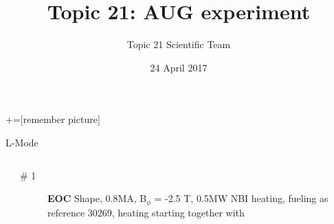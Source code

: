 \documentclass[10pt, compress]{beamer}
\title{Topic 21: AUG experiment}
\date{24 April 2017}
\author[Topic 21 Scientific Team]{Topic 21 Scientific Team}
\newcommand\Fontvi{\fontsize{8}{7.2}\selectfont}
\begin{document}
+=[remember picture]
\maketitle

\begin{frame}{L-Mode}
\Fontvi
  \vspace{-1cm}
\begin{columns}
  \begin{column}{0.5\textwidth}
  \end{column}
  \begin{column}{0.5\textwidth}
    \begin{description}
      \item[\# 1] \textbf{EOC} Shape, 0.8MA, B$_{\phi}$ = -2.5 T, 0.5MW NBI heating,
        fueling as reference 30269, heating starting together with

\end{description}
\end{column}
\end{columns}
\end{frame}
\end{document}
